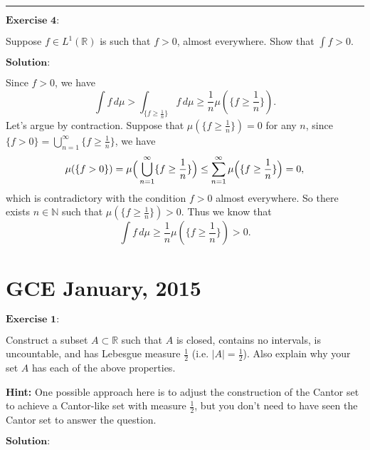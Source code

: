 \documentclass[12pt]{article}
\begin{document}
\noindent\rule[0.25\baselineskip]{\textwidth}{0.5pt}

\vspace{8pt}

$\textbf{Exercise 4:}$

Suppose $f \in L^{1}(\mathbb{R})$ is such that $f > 0$, almost everywhere. Show that $\int f > 0$.

\vspace{8pt}
$\textbf{Solution:}$

Since $f > 0$, we have
\begin{equation*}
    \int f \, d \mu > \int_{\{f \geq \frac{1}{n}\}} f \, d \mu \geq \frac{1}{n} \mu(\{f \geq \frac{1}{n}\}).
\end{equation*}
Let's argue by contraction. Suppose that $\mu(\{f \geq \frac{1}{n}\}) = 0$ for any $n$, since $\{f > 0\} = \bigcup_{n=1}^{\infty} \{f \geq \frac{1}{n}\}$, we have
\begin{equation*}
    \mu(\{f > 0\}) = \mu \Big{(} \bigcup_{n=1}^{\infty} \{f \geq \frac{1}{n}\} \Big{)} \leq \sum_{n = 1}^{\infty} \mu \Big{(} \{f \geq \frac{1}{n}\} \Big{)} = 0,
\end{equation*}
which is contradictory with the condition $f > 0$ almost everywhere. So there exists $n \in \mathbb{N}$ such that $\mu(\{f \geq \frac{1}{n}\}) > 0$. Thus we know that
\begin{equation*}
    \int f \, d \mu \geq  \frac{1}{n} \mu(\{f \geq \frac{1}{n}\}) > 0.
\end{equation*}

\newpage

\section{GCE January, 2015}

$\textbf{Exercise 1:}$

Construct a subset $A \subset \mathbb{R}$ such that $A$ is closed, contains no intervals, is uncountable, and has Lebesgue measure $\frac{1}{2}$ (i.e. $|A| = \frac{1}{2}$). Also explain why your set $A$ has each of the above properties.

\textbf{Hint:} One possible approach here is to adjust the construction of the Cantor set to achieve a Cantor-like set with measure $\frac{1}{2}$, but you don't need to have seen the Cantor set to answer the question.

\vspace{8pt}

$\textbf{Solution:}$
\end{document}
